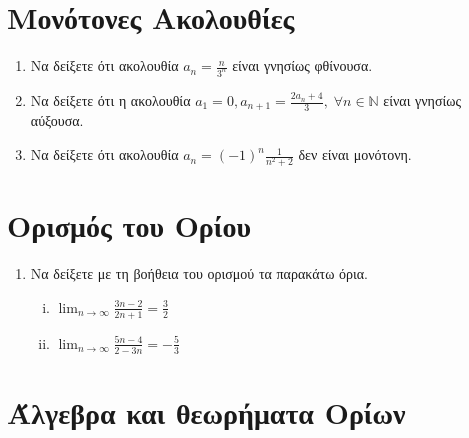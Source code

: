 \section{Μονότονες Ακολουθίες}

\begin{enumerate}
    \item Να δείξετε ότι ακολουθία $ a_{n} = \frac{n}{3^{n}} $ είναι 
        γνησίως φθίνουσα.
    \item Να δείξετε ότι η ακολουθία $ a_{1}=0, a_{n+1}= 
        \frac{2 a_{n}+4}{3}, \; \forall n \in \mathbb{N} $ είναι γνησίως 
        αύξουσα.
    \item Να δείξετε ότι ακολουθία $ a_{n} = (-1)^{n} \frac{1}{n^{2}+2} $ 
        δεν είναι μονότονη.
\end{enumerate}

\section{Ορισμός του Ορίου}

\begin{enumerate}
    \item Να δείξετε με τη βοήθεια του ορισμού τα παρακάτω όρια.
        \begin{enumerate}[i)]
            \item $ \lim_{n \to \infty} \frac{3n -2}{2n+1} = \frac{3}{2} $ 
            \item $ \lim_{n \to \infty} \frac{5n-4}{2-3n} = - \frac{5}{3} $ 
        \end{enumerate}
\end{enumerate}

\section{Άλγεβρα και θεωρήματα Ορίων}

